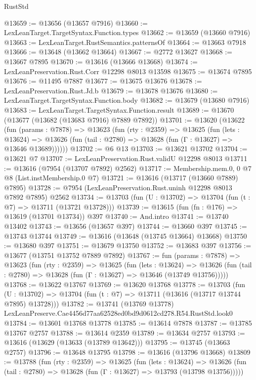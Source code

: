 \begin{lexlean}{RustStd}
\begin{coremodule}
@13659 := @13656 (@13657 @7916)
@13660 := LexLeanTarget.TargetSyntax.Function.types
@13662 := @13659 (@13660 @7916)
@13663 := LexLeanTarget.RustSemantics.patternsOf
@13664 := @13663 @7918
@13666 := @13648 (@13662 @13664)
@13667 := @2772 @13627
@13668 := @13667 @7895
@13670 := @13616 (@13666 @13668)
@13674 := LexLeanPreservation.Rust.Corr @12298 @8013 @13598
@13675 := @13674 @7895
@13676 := @11495 @7887
@13677 := @13675 @13676
@13678 := LexLeanPreservation.Rust.Jd.b
@13679 := @13678 @13676
@13680 := LexLeanTarget.TargetSyntax.Function.body
@13682 := @13679 (@13680 @7916)
@13683 := LexLeanTarget.TargetSyntax.Function.result
@13689 := @13670 (@13677 (@13682 (@13683 @7916) @7889 @7892))
@13701 := @13620
    (@13622
      (fun (params : @7878) =>
      @13623
        (fun (rty : @2359) =>
        @13625
          (fun (lets : @13624) =>
          @13626 (fun (tail : @2780) => @13628 (fun (Γ : @13627) => @13646 @13689))))))
@13702 := @6 @13
@13703 := @13621 @13702
@13704 := @13621 @7
@13707 := LexLeanPreservation.Rust.validU @12298 @8013
@13711 := @13616 (@7954 (@13707 @7892) @2562)
@13717 := Membership.mem.{0, 0} @7 @8 (List.instMembership.{0} @7)
@13721 := @13616 (@13717 (@13660 @7889) @7895)
@13728 := @7954 (LexLeanPreservation.Rust.uninh @12298 @8013 @7892 @7895) @2562
@13734 := @13703 (fun (U : @13702) => @13704 (fun (t : @7) => @13711 (@13721 @13728)))
@13739 := @13615 (fun (fn : @176) => @13619 (@13701 @13734)) @397
@13740 := And.intro
@13741 := @13740 @13402
@13743 := @13656 (@13657 @397)
@13744 := @13660 @397
@13745 := @13743 @13744
@13749 := @13616 (@13648 (@13745 @13664) @13668)
@13750 := @13680 @397
@13751 := @13679 @13750
@13752 := @13683 @397
@13756 := @13677 (@13751 @13752 @7889 @7892)
@13767 := fun (params : @7878) =>
  @13623
    (fun (rty : @2359) =>
    @13625
      (fun (lets : @13624) =>
      @13626 (fun (tail : @2780) => @13628 (fun (Γ : @13627) => @13646 (@13749 @13756)))))
@13768 := @13622 @13767
@13769 := @13620 @13768
@13778 := @13703
    (fun (U : @13702) => @13704 (fun (t : @7) => @13711 (@13616 (@13717 @13744 @7895) @13728)))
@13782 := @13741 (@13769 @13778) LexLeanPreserve.Cae4456d77aa62528ed0bd9d0612cd278.R54.RustStd.look0
@13784 := @13601 @13768 @13778
@13785 := @13614 @7878
@13787 := @13785 @13767 @2757
@13788 := @13614 @2359
@13789 := @13634 @2757
@13793 := @13616 (@13629 (@13633 (@13789 @13642)))
@13795 := @13745 (@13663 @2757)
@13796 := @13648 @13795
@13798 := @13616 (@13796 @13668)
@13809 := @13788
    (fun (rty : @2359) =>
    @13625
      (fun (lets : @13624) =>
      @13626 (fun (tail : @2780) => @13628 (fun (Γ : @13627) => @13793 (@13798 @13756)))))

\end{coremodule}
\end{lexlean}
